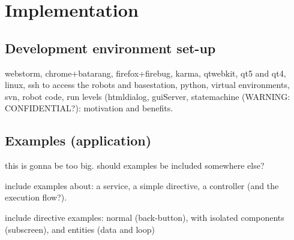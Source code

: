\chapter{Implementation}
\cite{Stefanov} \cite{Crockford} \cite{Darwin} \cite{AngularJSGuide} 

\section{Development environment set-up}
webstorm, chrome+batarang, firefox+firebug, karma, qtwebkit, qt5 and qt4, linux, ssh to access the robots and basestation, python, virtual environments, svn, robot code, run levels (htmldialog, guiServer, statemachine (WARNING: CONFIDENTIAL?): motivation and benefits.

\section{Examples (application)}
this is gonna be too big. should examples be included somewhere else?

include examples about: a service, a simple directive, a controller (and the execution flow?).

include directive examples: normal (back-button), with isolated components (subscreen), and entities (data and loop)
